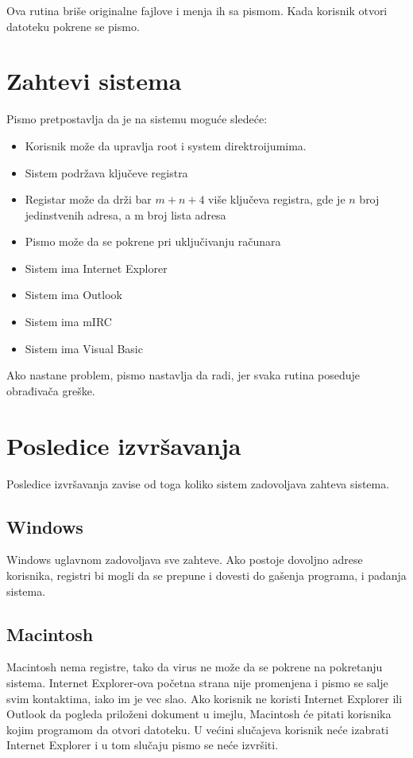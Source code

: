 \documentclass[a4paper]{article}
\begin{document}
Ova rutina briše originalne fajlove i menja ih sa pismom. Kada korisnik otvori datoteku pokrene se pismo. 

\section{Zahtevi sistema}
Pismo pretpostavlja da je na sistemu moguće sledeće:
\begin{itemize}
\item Korisnik može da upravlja root i system direktroijumima.
\item Sistem podržava ključeve registra
\item Registar može da drži bar $m+n+4$ više ključeva registra, gde je $n$ broj jedinstvenih adresa, a m broj lista adresa
\item Pismo može da se pokrene pri uključivanju računara
\item Sistem ima Internet Explorer
\item Sistem ima Outlook
\item Sistem ima mIRC
\item Sistem ima Visual Basic
\end{itemize}
Ako nastane problem, pismo nastavlja da radi, jer svaka rutina poseduje obrađivača greške.


\section{Posledice izvršavanja}
Posledice izvršavanja zavise od toga koliko sistem zadovoljava zahteva sistema.

\subsection{Windows}
Windows uglavnom zadovoljava sve zahteve. Ako postoje dovoljno adrese korisnika, registri bi mogli da se prepune i dovesti do gašenja programa, i padanja sistema.

\subsection{Macintosh}
Macintosh nema registre, tako da virus ne može da se pokrene na pokretanju sistema. Internet Explorer-ova početna strana nije promenjena i pismo se salje svim kontaktima, iako im je vec slao. Ako korisnik ne koristi Internet Explorer ili Outlook da pogleda priloženi dokument u imejlu, Macintosh će pitati korisnika kojim programom da otvori datoteku. U većini slučajeva korisnik neće izabrati Internet Explorer i u tom slučaju pismo se neće izvršiti.
\end{document}

